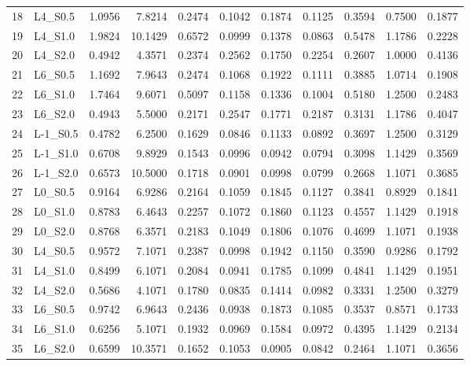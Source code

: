 \begin{tabular}{llrrrrrrrrr}
18 & L4_S0.5 & 1.0956 & 7.8214 & 0.2474 & 0.1042 & 0.1874 & 0.1125 & 0.3594 & 0.7500 & 0.1877 \\
19 & L4_S1.0 & 1.9824 & 10.1429 & 0.6572 & 0.0999 & 0.1378 & 0.0863 & 0.5478 & 1.1786 & 0.2228 \\
20 & L4_S2.0 & 0.4942 & 4.3571 & 0.2374 & 0.2562 & 0.1750 & 0.2254 & 0.2607 & 1.0000 & 0.4136 \\
21 & L6_S0.5 & 1.1692 & 7.9643 & 0.2474 & 0.1068 & 0.1922 & 0.1111 & 0.3885 & 1.0714 & 0.1908 \\
22 & L6_S1.0 & 1.7464 & 9.6071 & 0.5097 & 0.1158 & 0.1336 & 0.1004 & 0.5180 & 1.2500 & 0.2483 \\
23 & L6_S2.0 & 0.4943 & 5.5000 & 0.2171 & 0.2547 & 0.1771 & 0.2187 & 0.3131 & 1.1786 & 0.4047 \\
24 & L-1_S0.5 & 0.4782 & 6.2500 & 0.1629 & 0.0846 & 0.1133 & 0.0892 & 0.3697 & 1.2500 & 0.3129 \\
25 & L-1_S1.0 & 0.6708 & 9.8929 & 0.1543 & 0.0996 & 0.0942 & 0.0794 & 0.3098 & 1.1429 & 0.3569 \\
26 & L-1_S2.0 & 0.6573 & 10.5000 & 0.1718 & 0.0901 & 0.0998 & 0.0799 & 0.2668 & 1.1071 & 0.3685 \\
27 & L0_S0.5 & 0.9164 & 6.9286 & 0.2164 & 0.1059 & 0.1845 & 0.1127 & 0.3841 & 0.8929 & 0.1841 \\
28 & L0_S1.0 & 0.8783 & 6.4643 & 0.2257 & 0.1072 & 0.1860 & 0.1123 & 0.4557 & 1.1429 & 0.1918 \\
29 & L0_S2.0 & 0.8768 & 6.3571 & 0.2183 & 0.1049 & 0.1806 & 0.1076 & 0.4699 & 1.1071 & 0.1938 \\
30 & L4_S0.5 & 0.9572 & 7.1071 & 0.2387 & 0.0998 & 0.1942 & 0.1150 & 0.3590 & 0.9286 & 0.1792 \\
31 & L4_S1.0 & 0.8499 & 6.1071 & 0.2084 & 0.0941 & 0.1785 & 0.1099 & 0.4841 & 1.1429 & 0.1951 \\
32 & L4_S2.0 & 0.5686 & 4.1071 & 0.1780 & 0.0835 & 0.1414 & 0.0982 & 0.3331 & 1.2500 & 0.3279 \\
33 & L6_S0.5 & 0.9742 & 6.9643 & 0.2436 & 0.0938 & 0.1873 & 0.1085 & 0.3537 & 0.8571 & 0.1733 \\
34 & L6_S1.0 & 0.6256 & 5.1071 & 0.1932 & 0.0969 & 0.1584 & 0.0972 & 0.4395 & 1.1429 & 0.2134 \\
35 & L6_S2.0 & 0.6599 & 10.3571 & 0.1652 & 0.1053 & 0.0905 & 0.0842 & 0.2464 & 1.1071 & 0.3656 \\
\bottomrule
\end{tabular}
